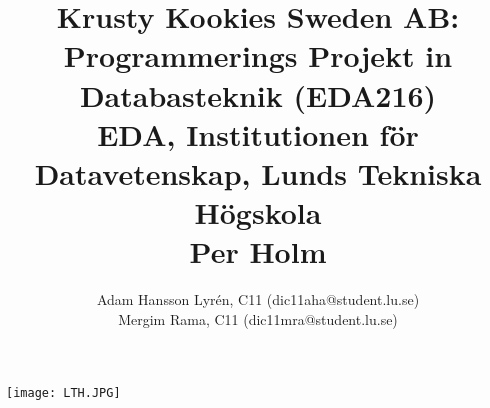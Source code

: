 \documentclass[a4paper]{article}%
\title{
	Krusty Kookies Sweden AB: Programmerings Projekt in Databasteknik (EDA216)\\
	EDA, Institutionen för Datavetenskap, Lunds Tekniska Högskola\\
	Per Holm}
\author{
Adam Hansson Lyrén, C11 (dic11aha@student.lu.se)\\
Mergim Rama, C11 (dic11mra@student.lu.se)\\
}
\begin{document}

\maketitle
\centerline{\texttt{[image: LTH.JPG]}}
\thispagestyle{empty}

\newpage
\setcounter{page}{1}


\tableofcontents
\newpage










\end{document}
